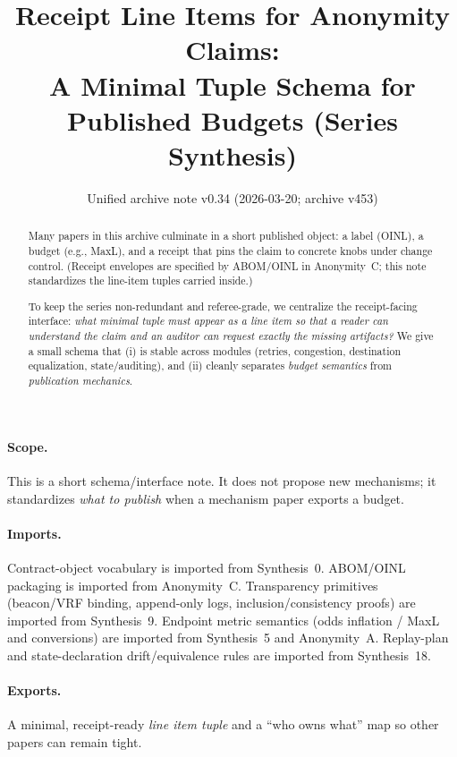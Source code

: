 \documentclass[11pt]{article}
\title{Receipt Line Items for Anonymity Claims:\\
\large A Minimal Tuple Schema for Published Budgets (Series Synthesis)}
\author{}
\date{Unified archive note v0.34 (2026-03-20; archive v453)}
\begin{document}
\maketitle

\begin{abstract}
Many papers in this archive culminate in a short published object: a label (OINL), a budget (e.g., MaxL), and a receipt that pins the claim to concrete knobs under change control.
(Receipt envelopes are specified by ABOM/OINL in Anonymity~C; this note standardizes the line-item tuples carried inside.)\cite{series:abomoinl}

To keep the series non-redundant and referee-grade, we centralize the receipt-facing interface:
\emph{what minimal tuple must appear as a line item so that a reader can understand the claim and an auditor can request exactly the missing artifacts?}
We give a small schema that (i) is stable across modules (retries, congestion, destination equalization, state/auditing), and (ii) cleanly separates \emph{budget semantics} from \emph{publication mechanics}.
\end{abstract}

\paragraph{Scope.}
This is a short schema/interface note.
It does not propose new mechanisms; it standardizes \emph{what to publish} when a mechanism paper exports a budget.

\paragraph{Imports.}
Contract-object vocabulary is imported from Synthesis~0.\cite{series:contractobjects}
ABOM/OINL packaging is imported from Anonymity~C.\cite{series:abomoinl}
Transparency primitives (beacon/VRF binding, append-only logs, inclusion/consistency proofs) are imported from Synthesis~9.\cite{series:transparencyprimitives}
Endpoint metric semantics (odds inflation / MaxL and conversions) are imported from Synthesis~5 and Anonymity~A.\cite{series:endpointbridge,series:oddsinflation}
Replay-plan and state-declaration drift/equivalence rules are imported from Synthesis~18.\cite{series:planstateequiv}

\paragraph{Exports.}
A minimal, receipt-ready \emph{line item tuple} and a ``who owns what'' map so other papers can remain tight.
\end{document}
